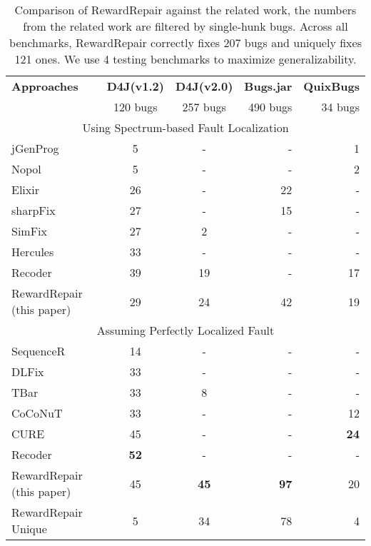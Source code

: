\begin{table}[t!]
\footnotesize
\renewcommand{\arraystretch}{1.28}
\begin{tabular}{lccrr}
\hline
 \textbf{Approaches} &\textbf{D4J(v1.2)} & \textbf{D4J(v2.0)} &
\textbf{Bugs.jar}& \textbf{QuixBugs} \\

& 120 bugs& 257 bugs & 490 bugs & 34 bugs   \\
\hline

 \multicolumn{5}{c}{Using Spectrum-based Fault Localization}  \\
\hline
jGenProg \cite{astor} & 5 & -& - & 1 \\
Nopol \cite{nopol} & 5& - & - & 2  \\
Elixir \cite{elixir} &26 & -&22 & -  \\
sharpFix \cite{sharpFix} &27& -&15&- \\
SimFix \cite{Simfix:2018}& 27 & 2 &- & -\\
Hercules \cite{hercules} &33& - & - &-\\
Recoder \cite{Recoder}&39 & 19 &-&17 \\
RewardRepair (this paper) & 29 & 24 & 42 & 19\\
\hline

 \multicolumn{5}{c}{Assuming Perfectly Localized Fault} \\
 \hline
SequenceR \cite{SEQUENCER} &14 & -& - & -  \\
DLFix \cite{DLFix} & 33 &- & -&- \\
TBar \cite{Liu2020Efficiency}&33 & 8 & - & -   \\

CoCoNuT \cite{CoCoNuT} &33& -&-&12 \\
CURE \cite{CURE-icse21}&45&-&-& \textbf{24} \\
Recoder \cite{Recoder}&\textbf{52}& - &-&- \\
\hline
RewardRepair (this paper) &45  & \textbf{45} &\textbf{97}&20\\
RewardRepair  Unique & 5 & 34 &78&4\\
\hline
\end{tabular}
\caption{Comparison of RewardRepair against the related work, the numbers from the related work are filtered by single-hunk bugs. Across all benchmarks, RewardRepair correctly fixes 207 bugs  and uniquely fixes 121 ones. We use 4 testing benchmarks to maximize generalizability.}
\label{tab:comparison-sota}
\end{table}

